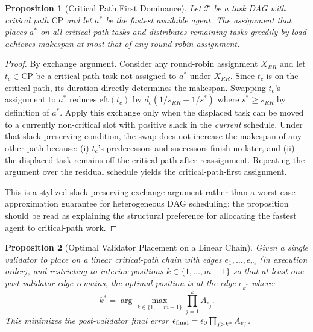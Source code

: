\documentclass[10pt, twocolumn]{article}
\newtheorem{proposition}{Proposition}
\begin{document}
\begin{proposition}[Critical Path First Dominance]
\label{prop:cpfirst}
Let $\mathcal{T}$ be a task DAG with critical path $\text{CP}$ and let $a^*$ be the fastest available agent. The assignment that places $a^*$ on all critical path tasks and distributes remaining tasks greedily by load achieves makespan at most that of any round-robin assignment.
\end{proposition}

\begin{proof}
By exchange argument. Consider any round-robin assignment $X_{RR}$ and let $t_c \in \text{CP}$ be a critical path task not assigned to $a^*$ under $X_{RR}$. Since $t_c$ is on the critical path, its duration directly determines the makespan. Swapping $t_c$'s assignment to $a^*$ reduces $\text{eft}(t_c)$ by $d_c(1/s_{RR} - 1/s^*)$ where $s^* \geq s_{RR}$ by definition of $a^*$. Apply this exchange only when the displaced task can be moved to a currently non-critical slot with positive slack in the \emph{current} schedule. Under that slack-preserving condition, the swap does not increase the makespan of any other path because: (i) $t_c$'s predecessors and successors finish no later, and (ii) the displaced task remains off the critical path after reassignment. Repeating the argument over the residual schedule yields the critical-path-first assignment.

This is a stylized slack-preserving exchange argument rather than a worst-case approximation guarantee for heterogeneous DAG scheduling; the proposition should be read as explaining the structural preference for allocating the fastest agent to critical-path work.
\end{proof}

\begin{proposition}[Optimal Validator Placement on a Linear Chain]
\label{prop:validator}
Given a single validator to place on a linear critical-path chain with edges $e_1, \ldots, e_m$ (in execution order), and restricting to interior positions $k \in \{1, \ldots, m{-}1\}$ so that at least one post-validator edge remains, the optimal position is at the edge $e_{k^*}$ where:
\begin{equation}
    k^* = \arg\max_{k \in \{1,\ldots,m-1\}} \prod_{j=1}^{k} A_{e_j}.
\end{equation}
This minimizes the post-validator final error $\epsilon_{\textup{final}} = \epsilon_0 \prod_{j > k^*} A_{e_j}$.
\end{proposition}
\end{document}
